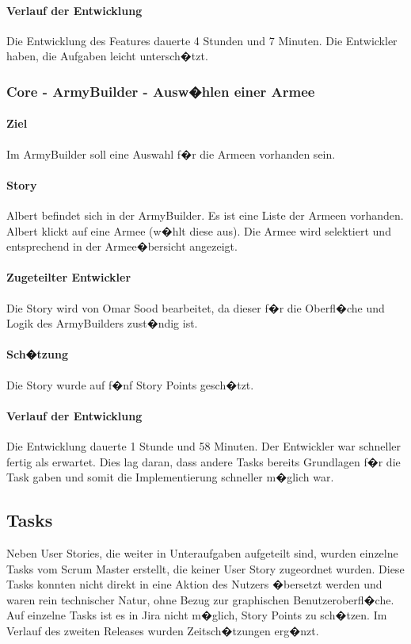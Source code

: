 \documentclass[12pt, titlepage]{scrartcl}
\begin{document}
		\paragraph{Verlauf der Entwicklung} 
		Die Entwicklung des Features dauerte 4 Stunden und 7 Minuten. Die Entwickler haben, die Aufgaben leicht untersch�tzt.
		
		\subsubsection{Core - ArmyBuilder - Ausw�hlen einer Armee}
		\paragraph{Ziel} Im ArmyBuilder soll eine Auswahl f�r die Armeen vorhanden sein.
		\paragraph{Story} Albert befindet sich in der ArmyBuilder. Es ist eine Liste der Armeen vorhanden. Albert klickt auf eine Armee (w�hlt diese aus). Die Armee wird selektiert und entsprechend in der Armee�bersicht angezeigt.
		\paragraph{Zugeteilter Entwickler} Die Story wird von Omar Sood bearbeitet, da dieser f�r die Oberfl�che und Logik des ArmyBuilders zust�ndig ist.
		\paragraph{Sch�tzung}
		Die Story wurde auf f�nf Story Points gesch�tzt.
		\paragraph{Verlauf der Entwicklung} 
		Die Entwicklung dauerte 1 Stunde und 58 Minuten. Der Entwickler war schneller fertig als erwartet. Dies lag daran, dass andere Tasks bereits Grundlagen f�r die Task gaben und somit die Implementierung schneller m�glich war.
		\subsection{Tasks}
		Neben User Stories, die weiter in Unteraufgaben aufgeteilt sind, wurden einzelne Tasks vom Scrum Master erstellt, die keiner User Story zugeordnet wurden. Diese Tasks konnten nicht direkt in eine Aktion des Nutzers �bersetzt werden und waren rein technischer Natur, ohne Bezug zur graphischen Benutzeroberfl�che. Auf einzelne Tasks ist es in Jira nicht m�glich, Story Points zu sch�tzen. Im Verlauf des zweiten Releases wurden Zeitsch�tzungen erg�nzt.
\end{document}
